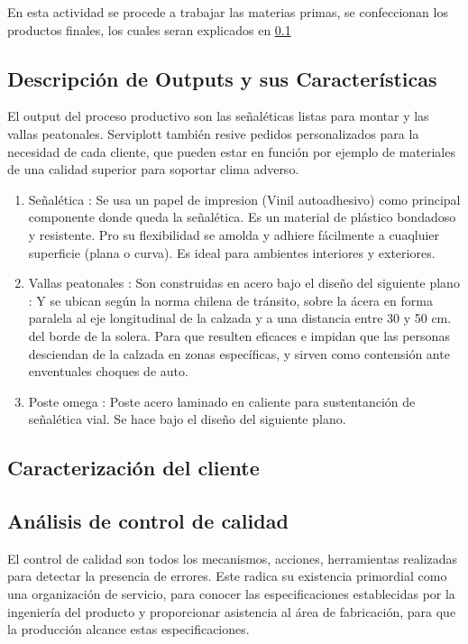 En esta actividad se procede a trabajar las materias primas, se confeccionan los productos finales, los cuales seran explicados en \ref{output}
	
	\subsection{Descripción de Outputs y sus Características}\label{output}
	El output del proceso productivo son las señaléticas listas para montar y las vallas peatonales. Serviplott también resive pedidos personalizados para la necesidad de cada cliente, que pueden estar en función por ejemplo de materiales de una calidad superior para soportar clima adverso.
	\begin{enumerate}[1)]
	\item Señalética : Se usa un papel de impresion (Vinil autoadhesivo) como principal componente donde queda la señalética. Es un material de plástico bondadoso y resistente. Pro su flexibilidad se amolda y adhiere fácilmente a cuaqluier superficie (plana o curva). Es ideal para ambientes interiores y exteriores.
	\item Vallas peatonales : Son construidas en acero bajo el diseño del siguiente plano : 
	Y se ubican según la norma chilena de tránsito, sobre la ácera en forma paralela al eje longitudinal de la calzada y a una distancia entre 30 y 50 cm. del borde de la solera. Para que resulten eficaces e impidan que las personas desciendan de la calzada en zonas específicas, y sirven como contensión ante enventuales choques de auto.
	\item Poste omega : Poste acero laminado en caliente para sustentanción de señalética vial. Se hace bajo el diseño del siguiente plano.
	\end{enumerate}
	\subsection{Caracterización del cliente}
    	
	
	\subsection{Análisis de control de calidad}
		El control de calidad son todos los mecanismos, acciones, herramientas realizadas para detectar la presencia de errores. Este radica su existencia primordial como una organización de servicio, para conocer las especificaciones establecidas por la ingeniería del producto y proporcionar asistencia al área de fabricación, para que la producción alcance estas especificaciones.	

